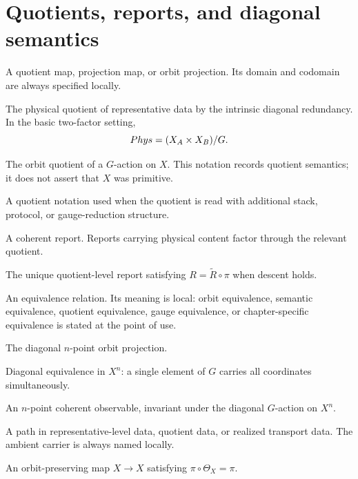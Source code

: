 \section*{Quotients, reports, and diagonal semantics}
\begin{description}[leftmargin=3.6cm,style=nextline]
\item[\(\pi\)]
A quotient map, projection map, or orbit projection.  Its domain and
codomain are always specified locally.
\item[\(\Phys\)]
The physical quotient of representative data by the intrinsic diagonal
redundancy.  In the basic two-factor setting,
\[
        Phys=(X_A\times X_B)/G .
\]
\item[\(X/G\)]
The orbit quotient of a \(G\)-action on \(X\).  This notation records
quotient semantics; it does not assert that \(X\) was primitive.
\item[\(X\sslash G\)]
A quotient notation used when the quotient is read with additional
stack, protocol, or gauge-reduction structure.
\item[\(R\)]
A coherent report.  Reports carrying physical content factor through the
relevant quotient.
\item[\(\widetilde R\)]
The unique quotient-level report satisfying \(R=\widetilde R\circ\pi\)
when descent holds.
\item[\(\sim\)]
An equivalence relation.  Its meaning is local: orbit equivalence,
semantic equivalence, quotient equivalence, gauge equivalence, or
chapter-specific equivalence is stated at the point of use.
\item[\(\pi_n:X^n\to X^n/G\)]
The diagonal \(n\)-point orbit projection.
\item[\(\sim_\Delta\)]
Diagonal equivalence in \(X^n\): a single element of \(G\) carries all
coordinates simultaneously.
\item[\(R^{(n)}\)]
An \(n\)-point coherent observable, invariant under the diagonal
\(G\)-action on \(X^n\).
\item[\(\Gamma\)]
A path in representative-level data, quotient data, or realized
transport data.  The ambient carrier is always named locally.
\item[\(\Theta_X\)]
An orbit-preserving map \(X\to X\) satisfying \(\pi\circ\Theta_X=\pi\).
\end{description}


